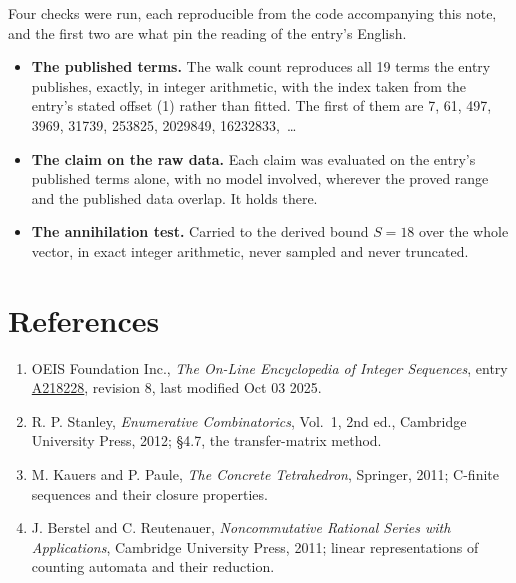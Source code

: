 \documentclass[11pt]{article}
\theoremstyle{definition}
\begin{document}
Four checks were run, each reproducible from the code accompanying this note, and the first two are what pin the reading of the entry's English.

\begin{itemize}

\item {\bfseries The published terms.} The walk count reproduces all 19 terms the entry publishes, exactly, in integer arithmetic, with the index taken from the entry's stated offset (1) rather than fitted. The first of them are 7, 61, 497, 3969, 31739, 253825, 2029849, 16232833,~\dots

\item {\bfseries The claim on the raw data.} Each claim was evaluated on the entry's published terms alone, with no model involved, wherever the proved range and the published data overlap. It holds there.

\item {\bfseries The annihilation test.} Carried to the derived bound $S = 18$ over the whole vector, in exact integer arithmetic, never sampled and never truncated.

\end{itemize}

\section{References}

\begin{enumerate}

\item OEIS Foundation Inc., \emph{The On-Line Encyclopedia of Integer Sequences}, entry \href{https://oeis.org/A218228}{A218228}, revision 8, last modified Oct 03 2025.

\item R. P. Stanley, \emph{Enumerative Combinatorics}, Vol.~1, 2nd ed., Cambridge University Press, 2012; \S4.7, the transfer-matrix method.

\item M. Kauers and P. Paule, \emph{The Concrete Tetrahedron}, Springer, 2011; C-finite sequences and their closure properties.

\item J. Berstel and C. Reutenauer, \emph{Noncommutative Rational Series with Applications}, Cambridge University Press, 2011; linear representations of counting automata and their reduction.

\end{enumerate}
\end{document}
